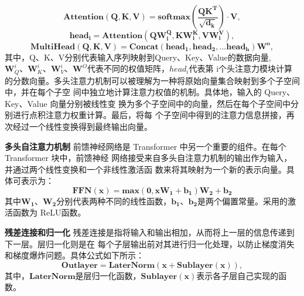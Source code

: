 \documentclass[withoutpreface,bwprint]{cumcmthesis} %
\begin{document}
	\begin{equation}
		\mathbf{Attention(Q,K,V)}  = \mathbf{softmax(\frac{Q{K}^T}{\sqrt{d_k}} )} \cdot \mathbf{V,}
	\end{equation}
	\begin{equation}
		\mathbf{{head}_i} = \mathbf{Attention(Q{W}^Q_i,	K{W}^K_i,V{W}^V_i),}
	\end{equation}
	\begin{equation}
		\mathbf{MultiHead(Q,K,V)} = \mathbf{Concat(head_1,head_2,...head_h){W}^o,}
	\end{equation}
	其中，Q、K、V分别代表输入序列映射到Query、Key、Value的数据向量,$\mathbf{W}^i_Q、\mathbf{W}^i_K、\mathbf{W}^i_V、\mathbf{W}^O$代表不同的权值矩阵，${head}_i$代表第
	i个头注意力模块计算的分数向量。多头注意力机制可以被理解为一种将原始向量集合映射到多个子空间中，并在每个子空
	间中独立地计算注意力权值的机制。具体地，输入的 Query、Key、Value 向量分别被线性变
	换为多个子空间中的向量，然后在每个子空间中分别进行点积注意力权重计算。最后，将每
	个子空间中得到的注意力信息拼接，再次经过一个线性变换得到最终输出向量。
	\par
	\textbf{ 多头自注意力机制 }
	前馈神经网络是 Transformer 中另一个重要的组件。在每个 Transformer 块中，前馈神经
	网络接受来自多头自注意力机制的输出作为输入，并通过两个线性变换和一个非线性激活函
	数来将其映射为一个新的表示向量。具体可表示为：
	\begin{equation}
		\mathbf{FFN(x)} = \mathbf{max(0,x{W}_1+b_1)W_2+b_2}
	\end{equation}
	其中$\mathbf{{W}_1}$、$\mathbf{{W}_2}$分别代表两种不同的线性函数，$\mathbf{{b}_1}$、$\mathbf{{b}_2}$是两个偏置常量。采用的激活函数为 ReLU函数。
	\par
	\textbf{残差连接和归一化 }
	残差连接是指将输入和输出相加，从而将上一层的信息传递到下一层。层归一化则是在
	每个子层输出前对其进行归一化处理，以防止梯度消失和梯度爆炸问题。具体公式如下所示：
	\begin{equation}
		\mathbf{Outlayer} = \mathbf{LaterNorm(x+Sublayer(x)),}
	\end{equation}
	其中，$\mathbf{LaterNorm}$是层归一化函数，$\mathbf{Sublayer(x)}$表示各子层自己实现的函数。
\end{document}

